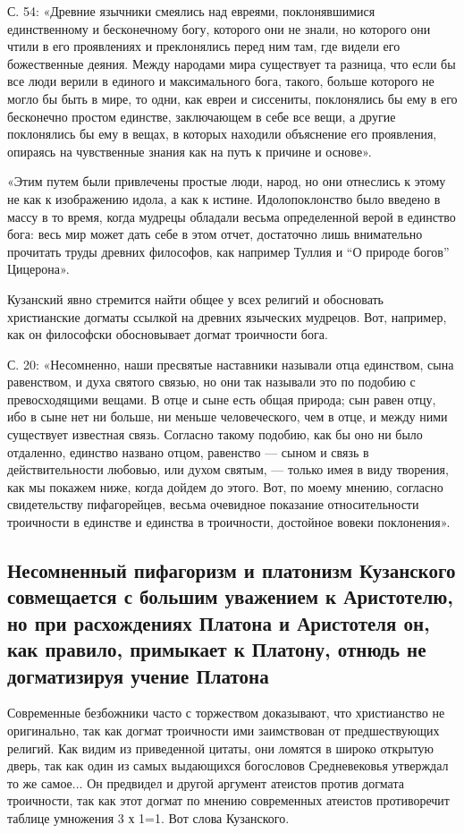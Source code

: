 С. 54: «Древние язычники смеялись над евреями, поклонявшимися
единственному и бесконечному богу, которого они не знали, но которого
они чтили в его проявлениях и преклонялись перед ним там, где видели
его божественные деяния. Между народами мира существует та разница,
что если бы все люди верили в единого и максимального бога, такого,
больше которого не могло бы быть в мире, то одни, как евреи и
сиссениты, поклонялись бы ему в его бесконечно простом единстве,
заключающем в себе все вещи, а другие поклонялись бы ему в вещах, в
которых находили объяснение его проявления, опираясь на чувственные
знания как на путь к причине и основе».

«Этим путем были привлечены простые люди, народ, но они отнеслись к
этому не как к изображению идола, а как к истине. Идолопоклонство было
введено в массу в то время, когда мудрецы обладали весьма определенной
верой в единство бога: весь мир может дать себе в этом отчет,
достаточно лишь внимательно прочитать труды древних философов, как
например Туллия и ``О природе богов'' Цицерона».

Кузанский явно стремится найти общее у всех религий и обосновать
христианские догматы ссылкой на древних языческих мудрецов. Вот,
например, как он философски обосновывает догмат троичности бога.

С. 20: «Несомненно, наши пресвятые наставники называли отца единством,
сына равенством, и духа святого связью, но они так называли это по
подобию с превосходящими вещами. В отце и сыне есть общая природа; сын
равен отцу, ибо в сыне нет ни больше, ни меньше человеческого, чем в
отце, и между ними существует известная связь. Согласно такому подобию,
как бы оно ни было отдаленно, единство названо отцом, равенство ---
сыном и связь в действительности любовью, или духом святым, --- только
имея в виду творения, как мы покажем ниже, когда дойдем до этого. Вот,
по моему мнению, согласно свидетельству пифагорейцев, весьма очевидное
показание относительности троичности в единстве и единства в
троичности, достойное вовеки поклонения».

\subsection{Несомненный пифагоризм и платонизм Кузанского совмещается
с большим уважением к Аристотелю, но при расхождениях Платона
и Аристотеля он, как правило, примыкает к Платону, отнюдь не
догматизируя учение Платона}

Современные безбожники часто с торжеством доказывают, что
христианство не оригинально, так как догмат троичности ими заимствован
от предшествующих религий. Как видим из приведенной цитаты, они
ломятся в широко открытую дверь, так как один из самых выдающихся
богословов Средневековья утверждал то же самое... Он предвидел и
другой аргумент атеистов против догмата троичности, так как этот
догмат по мнению современных атеистов противоречит таблице умножения 3
х 1=1. Вот слова Кузанского.

